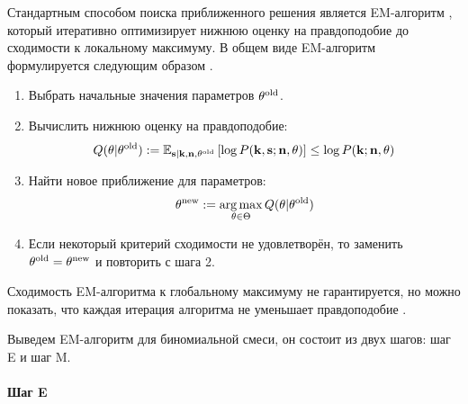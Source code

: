 Стандартным способом поиска приближенного решения является EM\hyp алгоритм \cite{dempster1977maximum},
который итеративно оптимизирует нижнюю оценку на правдоподобие до сходимости к локальному
максимуму. В общем виде EM\hyp алгоритм формулируется следующим образом
\cite[С. 351-352]{murphy2012machine}.

\begin{enumerate}
\item Выбрать начальные значения параметров $\mathbf{\theta}^{\operatorname{old}}$.
\item Вычислить нижнюю оценку на правдоподобие:
  $$
  Q(\mathbf{\theta}|\mathbf{\theta}^{\operatorname{old}})
  := \mathbb{E}_{\mathbf{s}|\mathbf{k}, \mathbf{n}, \mathbf{\theta^{\operatorname{old}}}} \left[ \log P(\mathbf{k}, \mathbf{s}; \mathbf{n}, \mathbf{\theta}) \right]
  \le \log P(\mathbf{k}; \mathbf{n}, \mathbf{\theta})
  $$

\item Найти новое приближение для параметров:
  $$
  \mathbf{\theta}^{\operatorname{new}} := \operatorname*{arg\,max}_{\mathbf{\theta} \in \Theta}
      Q(\mathbf{\theta}|\mathbf{\theta}^{\operatorname{old}})
  $$
\item Если некоторый критерий сходимости не удовлетворён, то заменить
  $\mathbf{\theta}^{\operatorname{old}} = \mathbf{\theta}^{\operatorname{new}}$ и повторить с шага 2.
\end{enumerate}

Сходимость EM\hyp алгоритма к глобальному максимуму не гарантируется, но можно показать,
что каждая итерация алгоритма не уменьшает правдоподобие \cite[С. 366-367]{murphy2012machine}.

Выведем EM-алгоритм для биномиальной смеси, он состоит из двух шагов: шаг E и шаг M.

\paragraph{Шаг E}

